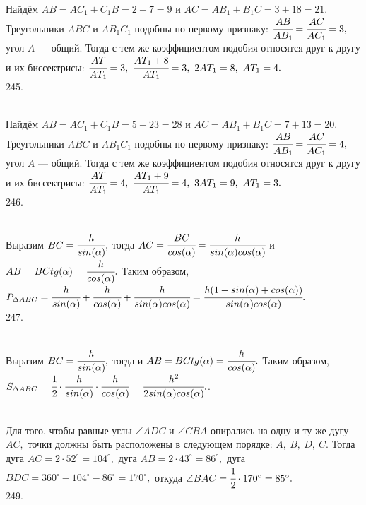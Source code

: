 Найдём $AB=AC_1+C_1B=2+7=9$ и $AC=AB_1+B_1C=3+18=21.$ Треугольники $ABC$ и $AB_1C_1$ подобны по первому признаку: $\cfrac{AB}{AB_1}=\cfrac{AC}{AC_1}=3,$ угол $A$ --- общий. Тогда с тем же коэффициентом подобия относятся друг к другу и их биссектрисы: $\cfrac{AT}{AT_1}=3,\ \cfrac{AT_1+8}{AT_1}=3,\ 2AT_1=8,\ AT_1=4.$\\
245. \begin{figure}[ht!]
\end{figure}\\
Найдём $AB=AC_1+C_1B=5+23=28$ и $AC=AB_1+B_1C=7+13=20.$ Треугольники $ABC$ и $AB_1C_1$ подобны по первому признаку: $\cfrac{AB}{AB_1}=\cfrac{AC}{AC_1}=4,$ угол $A$ --- общий. Тогда с тем же коэффициентом подобия относятся друг к другу и их биссектрисы: $\cfrac{AT}{AT_1}=4,\ \cfrac{AT_1+9}{AT_1}=4,\ 3AT_1=9,\ AT_1=3.$\\
246. \begin{figure}[ht!]
\end{figure}\\
Выразим $BC=\cfrac{h}{sin(\alpha)},$ тогда $AC=\cfrac{BC}{cos(\alpha)}=\cfrac{h}{sin(\alpha)cos(\alpha)}$ и $AB=BC tg(\alpha)=\cfrac{h}{cos(\alpha)}.$ Таким образом, $P_{\Delta ABC}=\cfrac{h}{sin(\alpha)}+\cfrac{h}{cos(\alpha)}+\cfrac{h}{sin(\alpha)cos(\alpha)}=
\cfrac{h(1+sin(\alpha)+cos(\alpha))}{sin(\alpha)cos(\alpha)}.$\\
247. \begin{figure}[ht!]
\end{figure}\\
Выразим $BC=\cfrac{h}{sin(\alpha)},$ тогда и $AB=BC tg(\alpha)=\cfrac{h}{cos(\alpha)}.$ Таким образом, $S_{\Delta ABC}=
\cfrac{1}{2}\cdot\cfrac{h}{sin(\alpha)}\cdot\cfrac{h}{cos(\alpha)}=
\cfrac{h^2}{2sin(\alpha)cos(\alpha)}.$\newpage{}. \begin{figure}[ht!]
\end{figure}\\
Для того, чтобы равные углы $\angle ADC$ и $\angle CBA$ опирались на одну и ту же дугу $AC,$ точки должны быть расположены в следующем порядке: $A,\ B,\ D,\ C.$ Тогда дуга $AC=2\cdot 52^\circ=104^\circ,$ дуга $AB=2\cdot43^\circ=86^\circ,$ дуга $BDC=360^\circ-104^\circ-86^\circ=170^\circ,$ откуда $\angle BAC=\cfrac{1}{2}\cdot 170^\circ=85^\circ.$\\
249. \begin{figure}[ht!]
\end{figure}\\
